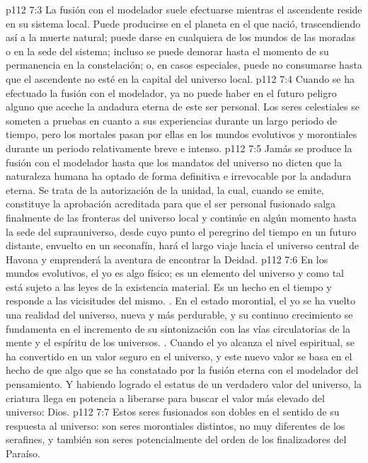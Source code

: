 \vs p112 7:3 La fusión con el modelador suele efectuarse mientras el ascendente reside en su sistema local. Puede producirse en el planeta en el que nació, trascendiendo así a la muerte natural; puede darse en cualquiera de los mundos de las moradas o en la sede del sistema; incluso se puede demorar hasta el momento de su permanencia en la constelación; o, en casos especiales, puede no consumarse hasta que el ascendente no esté en la capital del universo local.
\vs p112 7:4 Cuando se ha efectuado la fusión con el modelador, ya no puede haber en el futuro peligro alguno que aceche la andadura eterna de este ser personal. Los seres celestiales se someten a pruebas en cuanto a sus experiencias durante un largo periodo de tiempo, pero los mortales pasan por ellas en los mundos evolutivos y morontiales durante un periodo relativamente breve e intenso.
\vs p112 7:5 Jamás se produce la fusión con el modelador hasta que los mandatos del universo no dicten que la naturaleza humana ha optado de forma definitiva e irrevocable por la andadura eterna. Se trata de la autorización de la unidad, la cual, cuando se emite, constituye la aprobación acreditada para que el ser personal fusionado salga finalmente de las fronteras del universo local y continúe en algún momento hasta la sede del suprauniverso, desde cuyo punto el peregrino del tiempo en un futuro distante, envuelto en un seconafín, hará el largo viaje hacia el universo central de Havona y emprenderá la aventura de encontrar la Deidad.
\vs p112 7:6 \pc En los mundos evolutivos, el yo es algo físico; es un elemento del universo y como tal está sujeto a las leyes de la existencia material. Es un hecho en el tiempo y responde a las vicisitudes del mismo. . En el estado morontial, el yo se ha vuelto una realidad del universo, nueva y más perdurable, y su continuo crecimiento se fundamenta en el incremento de su sintonización con las vías circulatorias de la mente y el espíritu de los universos. . Cuando el yo alcanza el nivel espiritual, se ha convertido en un valor seguro en el universo, y este nuevo valor se basa en el hecho de que  algo que se ha constatado por la fusión eterna con el modelador del pensamiento. Y habiendo logrado el estatus de un verdadero valor del universo, la criatura llega en potencia a liberarse para buscar el valor más elevado del universo: Dios.
\vs p112 7:7 \pc Estos seres fusionados son dobles en el sentido de su respuesta al universo: son seres morontiales distintos, no muy diferentes de los serafines, y también son seres potencialmente del orden de los finalizadores del Paraíso.
